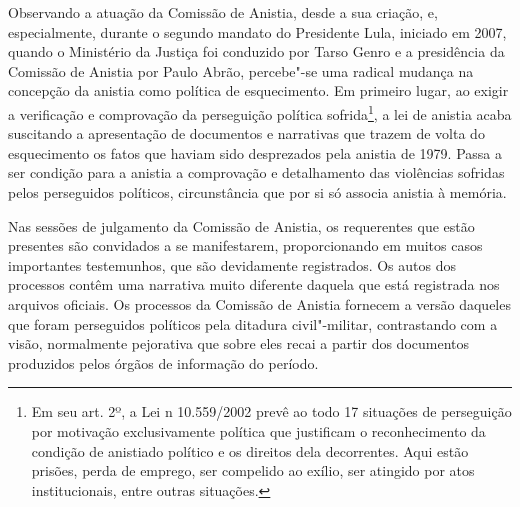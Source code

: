 Observando a atuação da Comissão de Anistia, desde a sua criação, e,
especialmente, durante o segundo mandato do Presidente Lula, iniciado em
2007, quando o Ministério da Justiça foi conduzido por Tarso Genro e a
presidência da Comissão de Anistia por Paulo Abrão, percebe"-se uma
radical mudança na concepção da anistia como política de esquecimento.
Em primeiro lugar, ao exigir a verificação e comprovação da perseguição
política sofrida\footnote{Em seu art. 2º, a Lei n 10.559/2002 prevê ao
  todo 17 situações de perseguição por motivação exclusivamente política
  que justificam o reconhecimento da condição de anistiado político e os
  direitos dela decorrentes. Aqui estão prisões, perda de emprego, ser
  compelido ao exílio, ser atingido por atos institucionais, entre
  outras situações.}, a lei de anistia acaba suscitando a apresentação
de documentos e narrativas que trazem de volta do esquecimento os fatos
que haviam sido desprezados pela anistia de 1979. Passa a ser condição
para a anistia a comprovação e detalhamento das violências sofridas
pelos perseguidos políticos, circunstância que por si só associa anistia
à memória.

Nas sessões de julgamento da Comissão de Anistia, os requerentes que
estão presentes são convidados a se manifestarem, proporcionando em
muitos casos importantes testemunhos, que são devidamente registrados.
Os autos dos processos contêm uma narrativa muito diferente daquela que
está registrada nos arquivos oficiais. Os processos da Comissão de
Anistia fornecem a versão daqueles que foram perseguidos políticos pela
ditadura civil"-militar, contrastando com a visão, normalmente pejorativa
que sobre eles recai a partir dos documentos produzidos pelos órgãos de
informação do período.

